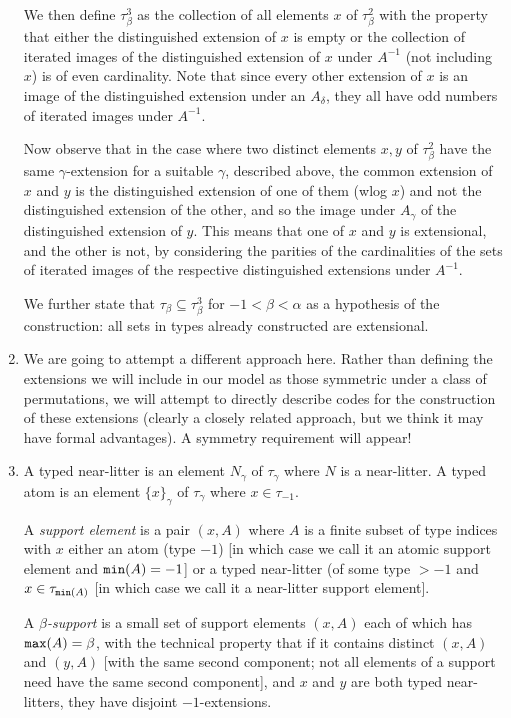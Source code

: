 \documentclass[12pt]{article}
\begin{document}
\begin{enumerate}
We then define $\tau^3_\beta$ as the collection of all elements $x$ of $\tau^2_\beta$ with the property that either the distinguished extension of $x$ is empty or the collection of iterated images of the distinguished extension of
$x$ under $A^{-1}$ (not including $x$) is of even cardinality.  Note that since every other extension of $x$ is an image of the distinguished extension under an $A_\delta$, they all have odd numbers of iterated images under $A^{-1}$.  

Now observe that in the case where two distinct elements $x,y$ of $\tau^2_\beta$ have the same $\gamma$-extension for a suitable $\gamma$, described above,
the common extension of $x$ and $y$ is the distinguished extension of one of them (wlog $x$) and not the distinguished extension of the other, and so the image under $A_\gamma$ of the distinguished extension of $y$.  This means that one of $x$ and $y$ is extensional, and the other is not, by considering the parities of the cardinalities of the sets of iterated images of the respective distinguished extensions under $A^{-1}$.

We further state that $\tau_\beta \subseteq \tau^3_\beta$ for $-1 < \beta < \alpha$ as a hypothesis of the construction:  all sets in types already constructed are extensional.

\item  We are going to attempt a different approach here.  Rather than defining the extensions we will include in our model as those symmetric under a class of permutations, we will
attempt to directly describe codes for the construction of these extensions (clearly a closely related approach, but we think it may have formal advantages).  A symmetry requirement will appear!

\item  A typed near-litter is an element $N_\gamma$ of $\tau_\gamma$ where $N$ is a near-litter.  A typed atom is an element $\{x\}_\gamma$ of $\tau_\gamma$ where
$x \in \tau_{-1}$.

A {\em support element\/} is a pair $(x,A)$ where $A$ is a finite subset of type indices with $x$ either an atom (type $-1$) [in which case we call it an atomic support element and ${\tt min}(A) =-1$] or a typed near-litter (of some type $>-1$ and $x \in \tau_{{\tt min}(A)}$ [in which case we call it a near-litter support element].

A {\em $\beta$-support\/} is a small set of support elements $(x,A)$ each of which has ${\tt max}(A)=\beta$, with the technical property that if it contains distinct $(x,A)$ and $(y,A)$ [with the same second component;  not all elements of a support need have the same second component], and $x$ and $y$ are both typed near-litters, they have disjoint $-1$-extensions.


\end{enumerate}
\end{document}
